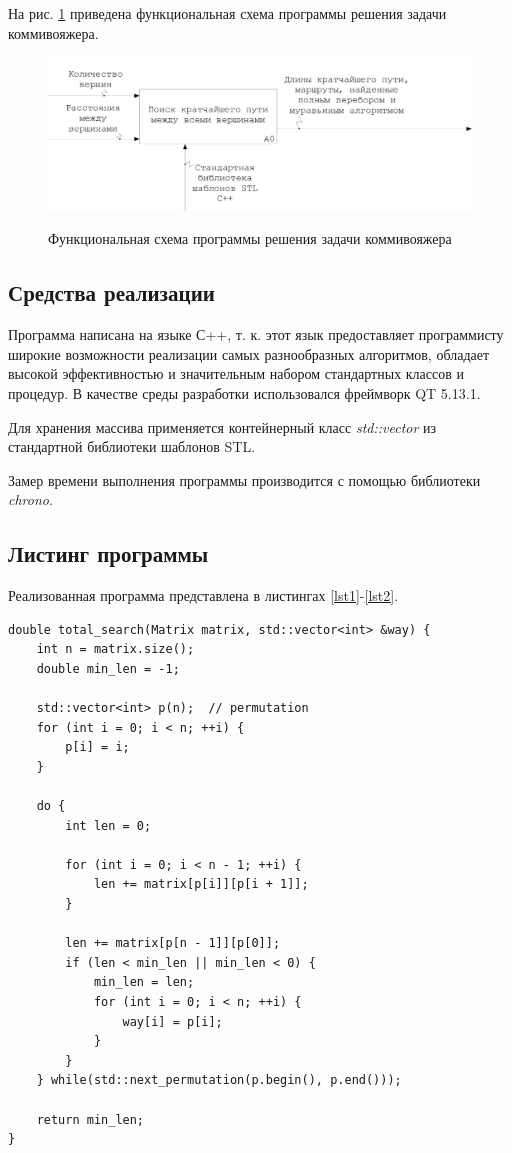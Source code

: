 \documentclass[a4paper,12pt]{article}
\begin{document}
На рис. \ref{fig:idef0} приведена 
функциональная схема 
программы решения задачи коммивояжера.
        
\begin{figure}[h!]
\begin{center}
{\includegraphics[width = \textwidth]{img/idef0.png}}
\caption{Функциональная схема 
программы решения задачи коммивояжера}
\label{fig:idef0}
\end{center}
\end{figure}
	
\subsection{Средства реализации}

Программа написана на языке С++, т. к. этот язык предоставляет программисту широкие возможности реализации самых разнообразных алгоритмов, обладает высокой эффективностью и значительным набором стандартных классов и процедур. В качестве среды разработки использовался  фреймворк QT 5.13.1.
	
Для хранения массива применяется 
контейнерный класс \textit{std::vector} из стандартной 
библиотеки шаблонов STL.

Замер времени выполнения программы 
производится с помощью библиотеки \textit{chrono}.
    
\subsection{Листинг программы}

Реализованная программа представлена
в листингах \ref{lst1}-\ref{lst2}.

\begin{lstlisting}[label=lst1,caption=Реализация
полного перебора для решения задачи коммивояжера]
double total_search(Matrix matrix, std::vector<int> &way) {
    int n = matrix.size();
    double min_len = -1;

    std::vector<int> p(n);  // permutation
    for (int i = 0; i < n; ++i) {
        p[i] = i;
    }
  
    do {
        int len = 0;

        for (int i = 0; i < n - 1; ++i) {
            len += matrix[p[i]][p[i + 1]];
        }

        len += matrix[p[n - 1]][p[0]];
        if (len < min_len || min_len < 0) {
            min_len = len;
            for (int i = 0; i < n; ++i) {
                way[i] = p[i];
            }
        }
    } while(std::next_permutation(p.begin(), p.end()));

    return min_len;
}
\end{lstlisting}
 
\end{document}
